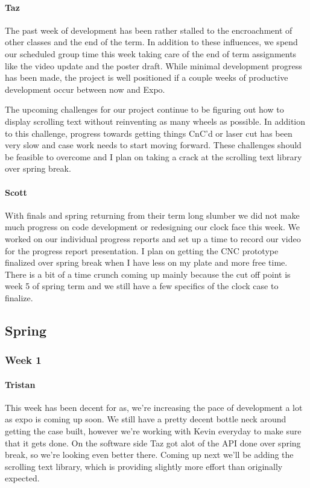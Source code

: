 \documentclass[onecolumn, draftclsnofoot,10pt, compsoc]{IEEEtran}
\begin{document}
\paragraph{Taz}
The past week of development has been rather stalled to the encroachment of other classes and the end of the term. In addition to these influences, we spend our scheduled group time this week taking care of the end of term assignments like the video update and the poster draft. While minimal development progress has been made, the project is well positioned if a couple weeks of productive development occur between now and Expo.

The upcoming challenges for our project continue to be figuring out how to display scrolling text without reinventing as many wheels as possible. In addition to this challenge, progress towards getting things CnC'd or laser cut has been very slow and case work needs to start moving forward. These challenges should be feasible to overcome and I plan on taking a crack at the scrolling text library over spring break.
\paragraph{Scott}
With finals and spring returning from their term long slumber we did not make much progress on code development or redesigning our clock face this week. We worked on our individual progress reports and set up a time to record our video for the progress report presentation. I plan on getting the CNC prototype finalized over spring break when I have less on my plate and more free time. There is a bit of a time crunch coming up mainly because the cut off point is week 5 of spring term and we still have a few specifics of the clock case to finalize.
\subsection{Spring}
\subsubsection{Week 1}
\paragraph{Tristan}
This week has been decent for as, we're increasing the pace of development a lot as expo is coming up soon. We still have a pretty decent bottle neck around getting the case built, however we're working with Kevin everyday to make sure that it gets done. On the software side Taz got alot of the API done over spring break, so we're looking even better there. Coming up next we'll be adding the scrolling text library, which is providing slightly more effort than originally expected.
\end{document}
